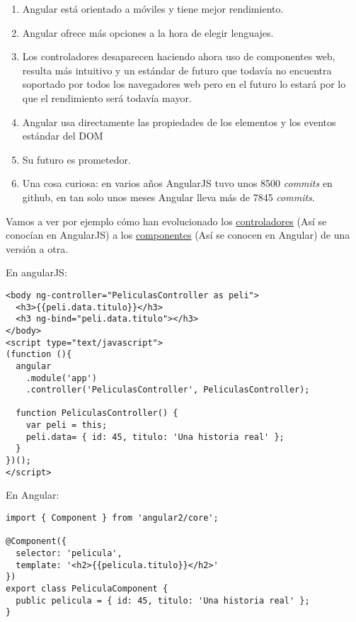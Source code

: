  \begin{enumerate}
	\item Angular está orientado a móviles y tiene mejor rendimiento.
	\item Angular ofrece más opciones a la hora de elegir lenguajes.
	\item Los controladores desaparecen haciendo ahora uso de componentes web, resulta más intuitivo y un estándar de futuro que todavía no encuentra soportado por todos los navegadores web pero en el futuro lo estará por lo que el rendimiento será todavía mayor.
	\item Angular usa directamente las propiedades de los elementos y los eventos estándar del DOM
	\item Su futuro es prometedor. 
	\item Una cosa curiosa: en varios años AngularJS tuvo unos 8500 \emph{commits} en github, en tan solo unos meses Angular lleva más de 7845 \emph{commits}.
\end{enumerate}
 
 Vamos a ver por ejemplo cómo han evolucionado los \underline{controladores} (Así se conocían en AngularJS) a los \underline{componentes} (Así se conocen en Angular) de una versión a otra.
 
 En angularJS:
 
 \lstset{breaklines=true, basicstyle=\footnotesize}
\begin{lstlisting}[frame=single]
<body ng-controller="PeliculasController as peli">  
  <h3>{{peli.data.titulo}}</h3>
  <h3 ng-bind="peli.data.titulo"></h3>
</body>  
<script type="text/javascript">  
(function (){
  angular
    .module('app')
    .controller('PeliculasController', PeliculasController);
 
  function PeliculasController() {
    var peli = this;
    peli.data= { id: 45, titulo: 'Una historia real' };
  }
})();
</script> 
\end{lstlisting}

En Angular:
 \lstset{breaklines=true, basicstyle=\footnotesize}
\begin{lstlisting}[frame=single]
import { Component } from 'angular2/core';
 
@Component({
  selector: 'pelicula',
  template: '<h2>{{pelicula.titulo}}</h2>'
})
export class PeliculaComponent {  
  public pelicula = { id: 45, titulo: 'Una historia real' };
}
\end{lstlisting}


